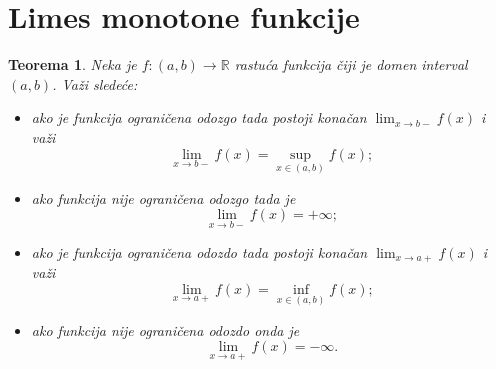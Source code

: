 \documentclass[a4paper,12pt]{article}
\theoremstyle{plain}
\newtheorem{theorem}{Teorema}[section]
\theoremstyle{definition}
\theoremstyle{remark}
\begin{document}
\section{Limes monotone funkcije}
\begin{theorem}
Neka je $f : (a,b) \rightarrow \mathbb{R}$ rastuća funkcija čiji je domen interval $(a,b)$. Važi sledeće:
\begin{itemize}
    \item[a)] ako je funkcija ograničena odozgo tada postoji konačan $\lim_{x \to b-} f(x)$ i važi
    $$\lim_{x \to b-} f(x) = \sup_{x \in (a,b)} f(x);$$
    \item[b)] ako funkcija nije ograničena odozgo tada je
    $$\lim_{x \to b-} f(x) = +\infty;$$
    \item[v)] ako je funkcija ograničena odozdo tada postoji konačan $\lim_{x \to a+} f(x)$ i važi
    $$\lim_{x \to a+} f(x) = \inf_{x \in (a,b)} f(x);$$
    \item[g)] ako funkcija nije ograničena odozdo onda je
    $$\lim_{x \to a+} f(x) = -\infty.$$
\end{itemize}
\end{theorem}
\end{document}
